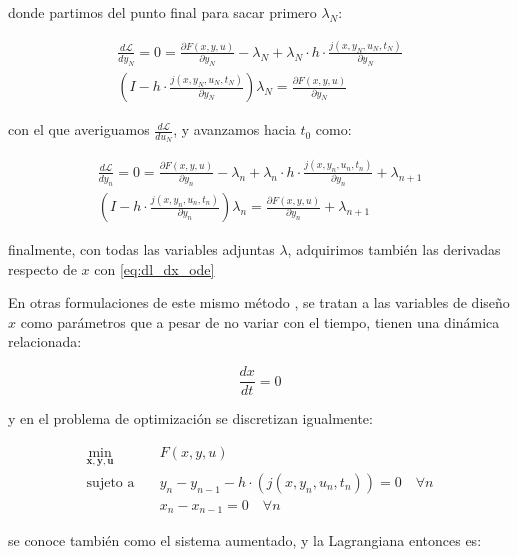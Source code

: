 donde partimos del punto final para sacar primero $\lambda_N$:

\begin{align}
	\frac{d\mathcal{L}}{dy_N} = 0 = \frac{\partial F(x, y, u)}{\partial y_N} - \lambda_N + \lambda_N \cdot h \cdot \frac{j(x, y_N, u_N, t_N)}{\partial y_N} \nonumber \\
	\left(I - h \cdot \frac{j(x, y_N, u_N, t_N)}{\partial y_N} \right) \lambda_N = \frac{\partial F(x, y, u)}{\partial y_N}
\end{align}

con el que averiguamos $\frac{d\mathcal{L}}{du_N}$, y avanzamos hacia $t_0$ como:

\begin{align}
	\frac{d\mathcal{L}}{dy_n}                                                    = 0 = \frac{\partial F(x, y, u)}{\partial y_n} - \lambda_n + \lambda_n \cdot h \cdot \frac{j(x, y_n, u_n, t_n)}{\partial y_n} + \lambda_{n+1} \\
	\left(I - h \cdot \frac{j(x, y_n, u_n, t_n)}{\partial y_n} \right) \lambda_n = \frac{\partial F(x, y, u)}{\partial y_n} + \lambda_{n+1}
\end{align}

finalmente, con todas las variables adjuntas $\lambda$, adquirimos también las derivadas
respecto de $x$ con \eqref{eq:dl_dx_ode}


En otras formulaciones de este mismo método \cite{zhang2022petsc}, se tratan a
las variables de diseño $x$ como parámetros que a pesar de no variar con el
tiempo, tienen una dinámica relacionada:

\begin{equation}
	\frac{dx}{dt} = 0
\end{equation}

y en el problema de optimización se discretizan igualmente:

\begin{align}
	\min_{\mathbf{x}, \mathbf{y}, \mathbf{u}} \quad & F(x, y, u) \nonumber                                                          \\
	\text{sujeto a} \quad                           & y_n - y_{n-1} - h \cdot (j(x, y_n, u_n, t_n)) = 0  \quad \forall n  \nonumber \\
	                                                & x_n - x_{n-1} = 0 \quad \forall n
\end{align}

se conoce también como el sistema aumentado, y la Lagrangiana entonces es:

